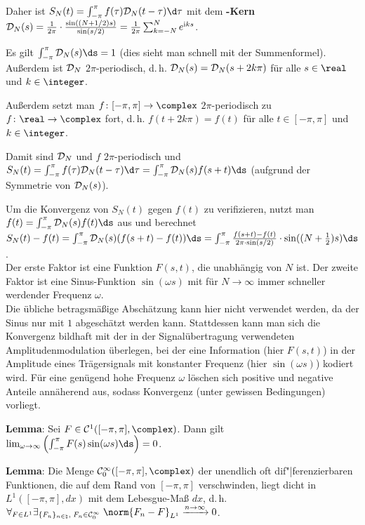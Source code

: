 Daher ist $S_N(t) = \int_{-\pi}^\pi f(\tau) \D_N(t - \tau)\d\tau$ mit
dem \textbf{-Kern}\\
$\mathcal{D}_N(s) = \frac{1}{2\pi} \cdot \frac{\sin((N + 1/2)s)}{\sin(s/2)} =
\frac{1}{2\pi} \sum_{k=-N}^N e^{\mathrm{i} ks}$.

\linie

Es gilt $\int_{-\pi}^\pi \D_N(s)\ds = 1$
(dies sieht man schnell mit der Summenformel).\\
Außerdem ist $\mathcal{D}_N$ $2\pi$-periodisch, d.\,h. $\mathcal{D}_N(s) = \mathcal{D}_N(s + 2k\pi)$ für
alle $s \in \real$ und $k \in \integer$.

Außerdem setzt man $f\colon [-\pi, \pi] \rightarrow \complex$
$2\pi$-periodisch zu $f\colon \real \rightarrow \complex$ fort, d.\,h.
$f(t + 2k\pi) = f(t)$ für alle $t \in [-\pi, \pi]$ und $k \in \integer$.

Damit sind $\mathcal{D}_N$ und $f$ $2\pi$-periodisch und
$S_N(t) = \int_{-\pi}^\pi f(\tau) \D_N(t - \tau) \d\tau =
\int_{-\pi}^\pi \D_N(s) f(s + t) \ds$
(aufgrund der Symmetrie von $\mathcal{D}_N(s)$).

Um die Konvergenz von $S_N(t)$ gegen $f(t)$ zu verifizieren, nutzt man
$f(t) = \int_{-\pi}^\pi \D_N(s) f(t) \ds$ aus und berechnet
$S_N(t) - f(t) = \int_{-\pi}^\pi \D_N(s) (f(s + t) - f(t)) \ds =
\int_{-\pi}^\pi \frac{f(s + t) - f(t)}{2\pi \cdot \sin(s/2)} \cdot
\sin((N + \frac{1}{2})s) \ds$.\\
Der erste Faktor ist eine Funktion $F(s, t)$, die unabhängig von $N$ ist.
Der zweite Faktor ist eine Sinus-Funktion $\sin(\omega s)$ mit für
$N \to \infty$ immer schneller werdender Frequenz $\omega$.\\
Die übliche betragsmäßige Abschätzung kann hier nicht verwendet werden, da der
Sinus nur mit $1$ abgeschätzt werden kann.
Stattdessen kann man sich die Konvergenz bildhaft mit der in der
Signalübertragung verwendeten Amplitudenmodulation überlegen, bei der
eine Information (hier $F(s, t)$) in der Amplitude eines Trägersignals
mit konstanter Frequenz (hier $\sin(\omega s)$) kodiert wird.
Für eine genügend hohe Frequenz $\omega$ löschen sich positive und negative
Anteile annäherend aus, sodass Konvergenz (unter gewissen Bedingungen)
vorliegt.

\linie
\pagebreak

\textbf{Lemma}:
Sei $F \in \C^1([-\pi, \pi], \complex)$.
Dann gilt $\lim_{\omega \to \infty}
\left(\int_{-\pi}^\pi F(s) \sin(\omega s) \ds\right) = 0$.

\textbf{Lemma}:
Die Menge $\C_0^\infty([-\pi, \pi], \complex)$ der unendlich oft
dif"|ferenzierbaren Funktionen, die auf dem Rand von $[-\pi, \pi]$
verschwinden, liegt dicht in $L^1([-\pi, \pi], dx)$ mit dem Lebesgue-Maß $dx$,
d.\,h. $\forall_{F \in L^1}
\exists_{\{F_n\}_{n \in \natural},\; F_n \in \C_0^\infty}\;
\norm{F_n - F}_{L^1} \xrightarrow{n \to \infty} 0$.

